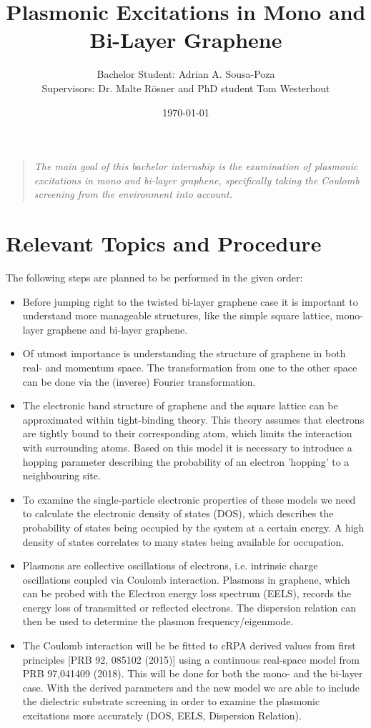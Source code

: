\documentclass{article}
\title{Plasmonic Excitations in Mono and Bi-Layer Graphene}
\author{\vspace{-1mm}Bachelor Student: Adrian A. Sousa-Poza\\
Supervisors: Dr. Malte Rösner and PhD student Tom Westerhout}
\affil{\vspace{-1mm}\textit{Radboud University Nijmegen, Faculty of Science}}
\date{\vspace{-3mm}\today}
\begin{document}
\maketitle


\begin{quote}
    \textit{The main goal of this bachelor internship is the examination of plasmonic excitations in mono and bi-layer graphene, specifically taking the Coulomb screening from the environment into account.}
\end{quote}

\section*{Relevant Topics and Procedure}

The following steps are planned to be performed in the given order:

\begin{itemize}
    \item Before jumping right to the twisted bi-layer graphene case it is important to understand more manageable structures, like the simple square lattice, mono-layer graphene and bi-layer graphene.
    \item Of utmost importance is understanding the structure of graphene in both real- and momentum space. The transformation from one to the other space can be done via the (inverse) Fourier transformation.
    \item The electronic band structure of graphene and the square lattice can be approximated within tight-binding theory. This theory assumes that electrons are tightly bound to their corresponding atom, which limits the interaction with surrounding atoms. Based on this model it is necessary to introduce a hopping parameter describing the probability of an electron 'hopping' to a neighbouring site.
    \item To examine the single-particle electronic properties of these models we need to calculate the electronic density of states (DOS), which describes the probability of states being occupied by the system at a certain energy. A high density of states correlates to many states being available for occupation.
    \item Plasmons are collective oscillations of electrons, i.e. intrinsic charge oscillations coupled via Coulomb interaction. Plasmons in graphene, which can be probed with the Electron energy loss spectrum (EELS), records the energy loss of transmitted or reflected electrons. The dispersion relation can then be used to determine the plasmon frequency/eigenmode.
    \item The Coulomb interaction will be be fitted to cRPA derived values from first principles [PRB 92, 085102 (2015)] using a continuous real-space model from PRB 97,041409 (2018). This will be done for both the mono- and the bi-layer case. With the derived parameters and the new model we are able to include the dielectric substrate screening in order to examine the plasmonic excitations more accurately (DOS, EELS, Dispersion Relation).
\end{itemize}
\end{document}
